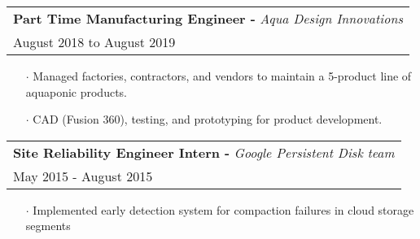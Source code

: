 \documentclass[letterpaper, oneside, final]{scrartcl} %
\begin{document}
\begin{center}
\begingroup\setlength{\fboxsep}{0pt}
\colorbox{mygray}{
\begin{flushleft}
\begin{tabularx}{\textwidth}{l}
\textbf{Part Time Manufacturing Engineer -} \textit{Aqua Design Innovations}\\
August 2018 to August 2019\\
\end{tabularx}
\end{flushleft}
}\endgroup
\vspace{-0.1cm}
\begin{itemize} \itemsep-0.2cm
\item[$\cdot$] Managed factories, contractors, and vendors to maintain a 5-product line of aquaponic products. \\
\item[$\cdot$] CAD (Fusion 360), testing, and prototyping for product development.\\
\end{itemize}

\begingroup\setlength{\fboxsep}{0pt}
\colorbox{mygray}{
\begin{flushleft}
\begin{tabularx}{\textwidth}{l}
\textbf{Site Reliability Engineer Intern -} \textit{Google Persistent Disk team}\\
May 2015 - August 2015\\
\end{tabularx}
\end{flushleft}
}\endgroup
\vspace{-0.1cm}
\begin{itemize} \itemsep-0.2cm
\item[$\cdot$] Implemented early detection system for compaction failures in cloud storage segments\\
\end{itemize}

	
\vspace{-0.5cm}


\end{center}
\end{document}
